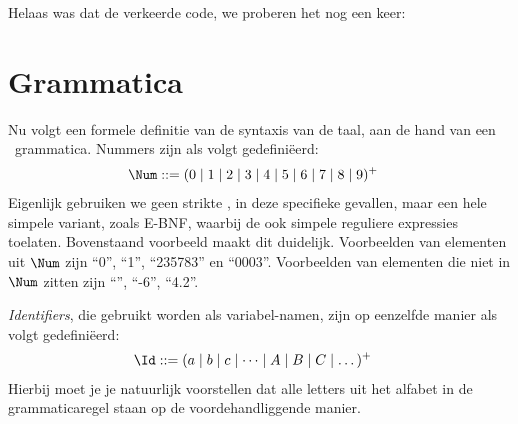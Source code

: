 Helaas was dat de verkeerde code, we proberen het nog een keer:



\section{Grammatica}

Nu volgt een formele definitie van de syntaxis van de taal, aan de hand van een \BNF\ grammatica. Nummers zijn als volgt gedefiniëerd:
\begin{align*}
  \Num \GrammarDef (0 \mid 1 \mid 2 \mid 3 \mid 4 \mid 5 \mid 6 \mid 7 \mid 8 \mid 9)^+
\end{align*}
Eigenlijk gebruiken we geen strikte \BNF, in deze specifieke gevallen, maar een hele simpele variant, zoals \textsc{E-BNF}, waarbij de ook simpele reguliere expressies toelaten.%
Bovenstaand voorbeeld maakt dit duidelijk. Voorbeelden van elementen uit $\Num$ zijn ``0'', ``1'', ``235783'' en ``0003''. Voorbeelden van elementen die niet in $\Num$ zitten zijn ``'', ``-6'', ``4.2''.

\emph{Identifiers}, die gebruikt worden als variabel-namen,%
zijn op eenzelfde manier als volgt gedefiniëerd:
\begin{align*}
  \Id \GrammarDef (a \mid b \mid c \mid \dots \mid A \mid B \mid C \mid \dots)^+
\end{align*}
Hierbij moet je je natuurlijk%
voorstellen dat alle letters uit het alfabet in de grammaticaregel staan op de voordehandliggende%
manier.

